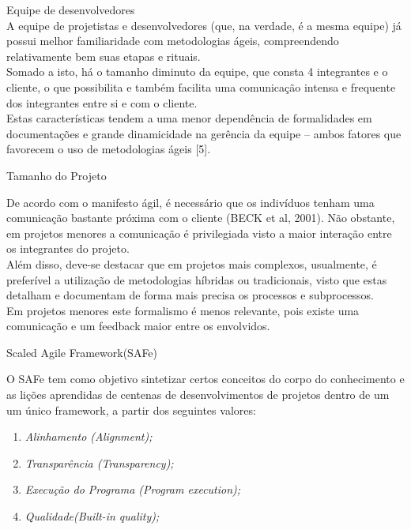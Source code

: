 {
	\large{Equipe de desenvolvedores\\

	\tab A equipe de projetistas e desenvolvedores (que, na verdade, é a mesma equipe) já possui melhor familiaridade com metodologias ágeis, compreendendo relativamente bem suas etapas e rituais. \\
	\tab Somado a isto, há o tamanho diminuto da equipe, que consta 4 integrantes e o cliente, o que possibilita e também facilita uma comunicação intensa e frequente dos integrantes entre si e com o cliente. \\
	\tab Estas características tendem a uma menor dependência de formalidades em documentações e grande dinamicidade na gerência da equipe – ambos fatores que favorecem o uso de metodologias ágeis [5]. \\
}

{
	\large{Tamanho do Projeto\\}

	\tab De acordo com o manifesto ágil, é necessário que os indivíduos tenham uma comunicação bastante próxima com o cliente (BECK et al, 2001). Não obstante, em projetos menores a comunicação é privilegiada visto a maior interação entre os integrantes do projeto. \\
	\tab Além disso, deve-se destacar que em projetos mais complexos, usualmente,  é preferível a utilização de metodologias híbridas ou tradicionais, visto que estas detalham e documentam de forma mais precisa os processos e subprocessos. \\
	\tab Em projetos menores este formalismo é menos relevante, pois existe uma comunicação e um feedback maior entre os envolvidos. \\
}

{
	\large{Scaled Agile Framework(SAFe)\\}

	\tab O SAFe  tem como objetivo sintetizar certos conceitos do corpo do conhecimento e as lições aprendidas de centenas de desenvolvimentos de projetos  dentro de um um único framework, a partir dos seguintes valores:\\

	\begin{enumerate}
		\item \textsl{Alinhamento (Alignment);} 
		\item \textsl{Transparência (Transparency);}
		\item \textsl{Execução do Programa (Program execution);} 
		\item \textsl{Qualidade(Built-in quality);}
	\end{enumerate}

}}
